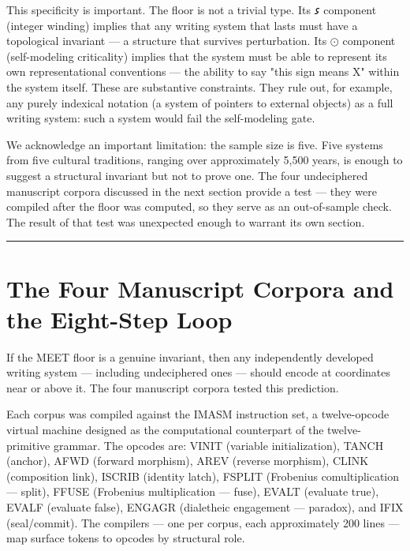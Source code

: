 \documentclass[12pt,a4paper]{article}
\begin{document}
This specificity is important. The floor is not a trivial type. Its $\text{𐑭}$ component (integer winding) implies that any writing system that lasts must have a topological invariant --- a structure that survives perturbation. Its $\text{⊙}$ component (self-modeling criticality) implies that the system must be able to represent its own representational conventions --- the ability to say "this sign means X" within the system itself. These are substantive constraints. They rule out, for example, any purely indexical notation (a system of pointers to external objects) as a full writing system: such a system would fail the self-modeling gate.

We acknowledge an important limitation: the sample size is five. Five systems from five cultural traditions, ranging over approximately 5,500 years, is enough to suggest a structural invariant but not to prove one. The four undeciphered manuscript corpora discussed in the next section provide a test --- they were compiled after the floor was computed, so they serve as an out-of-sample check. The result of that test was unexpected enough to warrant its own section.

\begin{center}
\rule{0.5\textwidth}{0.4pt}
\end{center}

\section{The Four Manuscript Corpora and the Eight-Step Loop}

If the MEET floor is a genuine invariant, then any independently developed writing system --- including undeciphered ones --- should encode at coordinates near or above it. The four manuscript corpora tested this prediction.

Each corpus was compiled against the IMASM instruction set, a twelve-opcode virtual machine designed as the computational counterpart of the twelve-primitive grammar. The opcodes are: VINIT (variable initialization), TANCH (anchor), AFWD (forward morphism), AREV (reverse morphism), CLINK (composition link), ISCRIB (identity latch), FSPLIT (Frobenius comultiplication --- split), FFUSE (Frobenius multiplication --- fuse), EVALT (evaluate true), EVALF (evaluate false), ENGAGR (dialetheic engagement --- paradox), and IFIX (seal/commit). The compilers --- one per corpus, each approximately 200 lines --- map surface tokens to opcodes by structural role.
\end{document}
